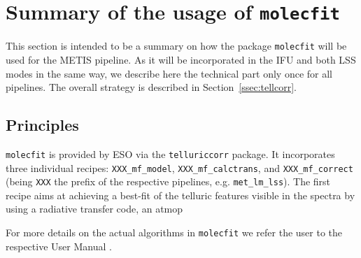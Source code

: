 \section{Summary of the usage of \texttt{molecfit}}\label{app:mf}
This section is intended to be a summary on how the package \texttt{molecfit} will be used for the \ac{METIS} pipeline. As it will be incorporated in the \ac{IFU} and both \ac{LSS} modes in the same way, we describe here the technical part only once for all pipelines. The overall strategy is described in Section~\ref{ssec:tellcorr}.
\subsection{Principles}\label{app:mf_principles}
\texttt{molecfit} is provided by \ac{ESO} via the \texttt{telluriccorr} package. It incorporates three individual recipes: \texttt{XXX_mf_model}, \texttt{XXX_mf_calctrans}, and \texttt{XXX_mf_correct} (being \texttt{XXX} the prefix of the respective pipelines, e.g. \texttt{met_lm_lss}). The first recipe aims at achieving a best-fit of the telluric features visible in the spectra by using a radiative transfer code, an atmop

For more details on the actual algorithms in \texttt{molecfit} we refer the user to the respective User Manual \cite{molecfit}.\\

